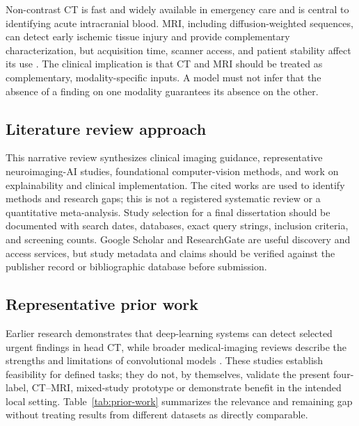\documentclass[10pt,a4paper]{article}
\begin{document}
Non-contrast CT is fast and widely available in emergency care and is central to identifying acute intracranial blood. MRI, including diffusion-weighted sequences, can detect early ischemic tissue injury and provide complementary characterization, but acquisition time, scanner access, and patient stability affect its use \citep{chalela2007,warach1992,kidwell2004,wintermark2013}. The clinical implication is that CT and MRI should be treated as complementary, modality-specific inputs. A model must not infer that the absence of a finding on one modality guarantees its absence on the other.

\subsection{Literature review approach}
This narrative review synthesizes clinical imaging guidance, representative neuroimaging-AI studies, foundational computer-vision methods, and work on explainability and clinical implementation. The cited works are used to identify methods and research gaps; this is not a registered systematic review or a quantitative meta-analysis. Study selection for a final dissertation should be documented with search dates, databases, exact query strings, inclusion criteria, and screening counts. Google Scholar and ResearchGate are useful discovery and access services, but study metadata and claims should be verified against the publisher record or bibliographic database before submission.

\subsection{Representative prior work}
Earlier research demonstrates that deep-learning systems can detect selected urgent findings in head CT, while broader medical-imaging reviews describe the strengths and limitations of convolutional models \citep{titano2018,chilamkurthy2018,kuo2019,arbabshirani2018,litjens2017,shen2017}. These studies establish feasibility for defined tasks; they do not, by themselves, validate the present four-label, CT--MRI, mixed-study prototype or demonstrate benefit in the intended local setting. Table~\ref{tab:prior-work} summarizes the relevance and remaining gap without treating results from different datasets as directly comparable.
\end{document}

